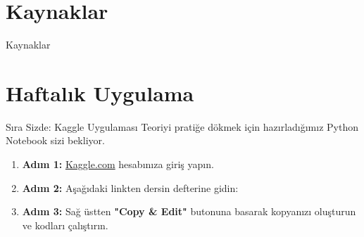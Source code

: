 \documentclass[light]{lutbeamer}
\begin{document}
\section{Kaynaklar}
\begin{frame}[allowframebreaks]{Kaynaklar}
    \nocite{*}
    \printbibliography{}
\end{frame}

\section{Haftalık Uygulama}
\begin{frame}{Sıra Sizde: Kaggle Uygulaması}
    \justifying{}
    Teoriyi pratiğe dökmek için hazırladığımız Python Notebook sizi bekliyor.
    
    \vspace{0.5cm}
    \begin{enumerate}
        \item \textbf{Adım 1:} \href{https://www.kaggle.com}{Kaggle.com} hesabınıza giriş yapın.
        \item \textbf{Adım 2:} Aşağıdaki linkten dersin defterine gidin:
        
        \vspace{0.3cm}
        \begin{center}
        \end{center}
        \vspace{0.3cm}
        
        \item \textbf{Adım 3:} Sağ üstten \textbf{"Copy \& Edit"} butonuna basarak kopyanızı oluşturun ve kodları çalıştırın.
    \end{enumerate}
\end{frame}
\end{document}
